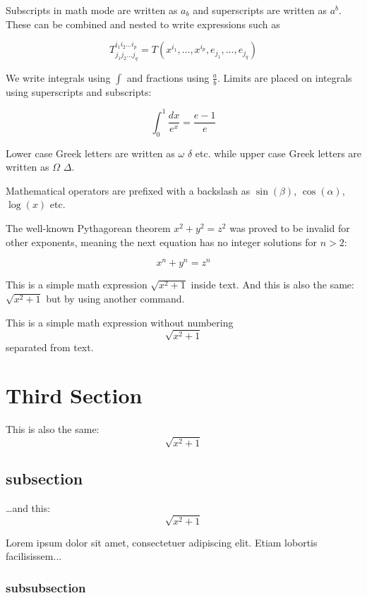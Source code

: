 \documentclass[12pt]{book}
\begin{document}
Subscripts in math mode are written as $a_b$ and superscripts are written as $a^b$. These can be combined and nested to write expressions such as

\[ T^{i_1 i_2 \dots i_p}_{j_1 j_2 \dots j_q} = T(x^{i_1},\dots,x^{i_p},e_{j_1},\dots,e_{j_q}) \]

We write integrals using $\int$ and fractions using $\frac{a}{b}$. Limits are placed on integrals using superscripts and subscripts:

\[ \int_0^1 \frac{dx}{e^x} =  \frac{e-1}{e} \]

Lower case Greek letters are written as $\omega$ $\delta$ etc. while upper case Greek letters are written as $\Omega$ $\Delta$.

Mathematical operators are prefixed with a backslash as $\sin(\beta)$, $\cos(\alpha)$, $\log(x)$ etc.

The well-known Pythagorean theorem \(x^2 + y^2 = z^2\) was proved to be invalid for other exponents, meaning the next equation has no integer solutions for \(n>2\):

\[ x^n + y^n = z^n \]

This is a simple math expression \(\sqrt{x^2+1}\) inside text. 
And this is also the same: 
\begin{math}
\sqrt{x^2+1}
\end{math}
but by using another command.

This is a simple math expression without numbering
\[\sqrt{x^2+1}\] 
separated from text.

\section{Third Section}

This is also the same:
\begin{displaymath}
\sqrt{x^2+1}
\end{displaymath}

\subsection{subsection}

\ldots and this:
\begin{equation*}
\sqrt{x^2+1}
\end{equation*}

Lorem ipsum dolor sit amet, consectetuer adipiscing elit. Etiam lobortis facilisissem...

\subsubsection{subsubsection}
\end{document}
